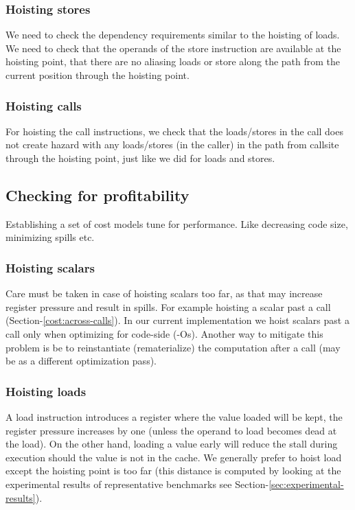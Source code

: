 \documentclass{sig-alternate}
\begin{document}
\subsubsection{Hoisting stores}
We need to check the dependency requirements similar to the hoisting of
loads. We need to check that the operands of the store instruction are available
at the hoisting point, that there are no aliasing loads or store along the path
from the current position through the hoisting point.

\subsubsection{Hoisting calls}
For hoisting the call instructions, we check that the loads/stores in the call
does not create hazard with any loads/stores (in the caller) in the path from
callsite through the hoisting point, just like we did for loads and stores.

\subsection{Checking for profitability}
Establishing a set of cost models tune for performance. Like decreasing code
size, minimizing spills etc.

\subsubsection{Hoisting scalars}
Care must be taken in case of hoisting scalars too far, as that may increase
register pressure and result in spills. For example hoisting a scalar past a
call (Section-\ref{cost:across-calls}). In our current implementation we hoist
scalars past a call only when optimizing for code-side (-Os). Another way to
mitigate this problem is be to reinstantiate (rematerialize) the computation
after a call (may be as a different optimization pass).

\subsubsection{Hoisting loads}
A load instruction introduces a register where the value loaded will be kept,
the register pressure increases by one (unless the operand to load becomes dead
at the load). On the other hand, loading a value early will reduce the stall
during execution should the value is not in the cache. We generally prefer to
hoist load except the hoisting point is too far (this distance is computed by
looking at the experimental results of representative benchmarks see
Section-\ref{sec:experimental-results}).
\end{document}
